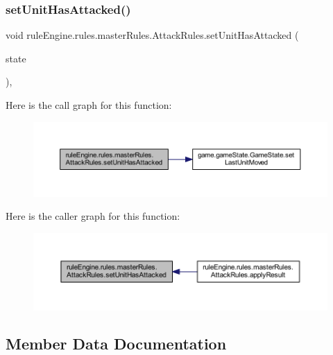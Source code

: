 \subsubsection{\texorpdfstring{set\+Unit\+Has\+Attacked()}{setUnitHasAttacked()}}
{\footnotesize\ttfamily void rule\+Engine.\+rules.\+master\+Rules.\+Attack\+Rules.\+set\+Unit\+Has\+Attacked (\begin{DoxyParamCaption}\item[{\mbox{\hyperlink{classgame_1_1game_state_1_1_game_state}{Game\+State}}}]{state }\end{DoxyParamCaption})\hspace{0.3cm}{\ttfamily [inline]}, {\ttfamily [private]}}

Here is the call graph for this function\+:
\nopagebreak
\begin{figure}[H]
\begin{center}
\leavevmode
\includegraphics[width=350pt]{classrule_engine_1_1rules_1_1master_rules_1_1_attack_rules_ab487cbbc141d3f0db64c03466e690810_cgraph}
\end{center}
\end{figure}
Here is the caller graph for this function\+:
\nopagebreak
\begin{figure}[H]
\begin{center}
\leavevmode
\includegraphics[width=350pt]{classrule_engine_1_1rules_1_1master_rules_1_1_attack_rules_ab487cbbc141d3f0db64c03466e690810_icgraph}
\end{center}
\end{figure}


\subsection{Member Data Documentation}
\mbox{\label{classrule_engine_1_1rules_1_1master_rules_1_1_attack_rules_aef7304924044302e0b16bae9661e0dfb}} 
